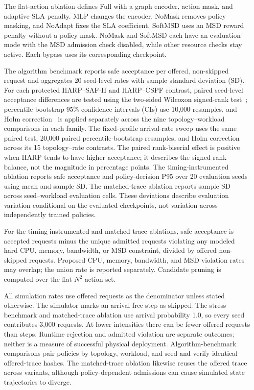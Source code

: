 \documentclass[final,5p]{elsarticle}
\newcommand{\rev}[1]{\textcolor{revisiongreen}{#1}}
\let\newrev\rev
\begin{document}
\newrev{The flat-action ablation defines Full with a graph encoder, action mask, and adaptive SLA penalty. MLP changes the encoder, NoMask removes policy masking, and NoAdapt fixes the SLA coefficient. SoftMSD uses an MSD reward penalty without a policy mask. NoMask and SoftMSD each have an evaluation mode with the MSD admission check disabled, while other resource checks stay active. Each bypass uses its corresponding checkpoint.}

\newrev{The algorithm benchmark reports safe acceptance per offered, non-skipped request and aggregates 20 seed-level rates with sample standard deviation (SD). For each protected HARP--SAF-H and HARP--CSPF contrast, paired seed-level acceptance differences are tested using the two-sided Wilcoxon signed-rank test~\cite{wilcoxon1945}; percentile-bootstrap 95\% confidence intervals (CIs) use 10,000 resamples, and Holm correction~\cite{holm1979} is applied separately across the nine topology--workload comparisons in each family. The fixed-profile arrival-rate sweep uses the same paired test, 20,000 paired percentile-bootstrap resamples, and Holm correction across its 15 topology--rate contrasts. The paired rank-biserial effect is positive when HARP tends to have higher acceptance; it describes the signed rank balance, not the magnitude in percentage points. The timing-instrumented ablation reports safe acceptance and policy-decision P95 over 20 evaluation seeds using mean and sample SD. The matched-trace ablation reports sample SD across seed--workload evaluation cells. These deviations describe evaluation variation conditional on the evaluated checkpoints, not variation across independently trained policies.}

\newrev{For the timing-instrumented and matched-trace ablations, safe acceptance is accepted requests minus the unique admitted requests violating any modeled hard CPU, memory, bandwidth, or MSD constraint, divided by offered non-skipped requests. Proposed CPU, memory, bandwidth, and MSD violation rates may overlap; the union rate is reported separately. Candidate pruning is computed over the flat $N^2$ action set.}

\newrev{All simulation rates use offered requests as the denominator unless stated otherwise. The simulator marks an arrival-free step as skipped. The stress benchmark and matched-trace ablation use arrival probability 1.0, so every seed contributes 3,000 requests. At lower intensities there can be fewer offered requests than steps. Runtime rejection and admitted violation are separate outcomes; neither is a measure of successful physical deployment. Algorithm-benchmark comparisons pair policies by topology, workload, and seed and verify identical offered-trace hashes. The matched-trace ablation likewise reuses the offered trace across variants, although policy-dependent admissions can cause simulated state trajectories to diverge.}
\end{document}
